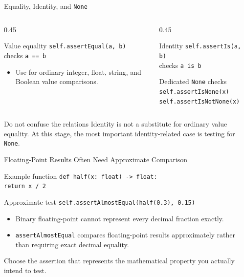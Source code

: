 \documentclass[aspectratio=169,10pt]{beamer}
\begin{document}
\begin{frame}{Equality, Identity, and \texttt{None}}
  \begin{columns}[T,onlytextwidth]
    \begin{column}{0.45\textwidth}
      \begin{block}{Value equality}
        \texttt{self.assertEqual(a, b)}\\
        checks \texttt{a == b}
      \end{block}
      \begin{itemize}
        \item Use for ordinary integer, float, string, and Boolean value comparisons.
      \end{itemize}
    \end{column}
    \begin{column}{0.45\textwidth}
      \begin{block}{Identity}
        \texttt{self.assertIs(a, b)}\\
        checks \texttt{a is b}
      \end{block}
      \begin{block}{Dedicated \texttt{None} checks}
        \texttt{self.assertIsNone(x)}\\
        \texttt{self.assertIsNotNone(x)}
      \end{block}
    \end{column}
  \end{columns}

  \begin{alertblock}{Do not confuse the relations}
    Identity is not a substitute for ordinary value equality. At this stage, the most important identity-related case is testing for \texttt{None}.
  \end{alertblock}
\end{frame}

\begin{frame}{Floating-Point Results Often Need Approximate Comparison}
  \begin{block}{Example function}
    \texttt{def half(x: float) -> float:}\\
    \hspace*{0.20in}\texttt{return x / 2}
  \end{block}

  \begin{block}{Approximate test}
    \texttt{self.assertAlmostEqual(half(0.3), 0.15)}
  \end{block}

  \begin{itemize}
    \item Binary floating-point cannot represent every decimal fraction exactly.
    \item \texttt{assertAlmostEqual} compares floating-point results approximately rather than requiring exact decimal equality.
  \end{itemize}

  \begin{keyidea}
    Choose the assertion that represents the mathematical property you actually intend to test.
  \end{keyidea}
\end{frame}
\end{document}

